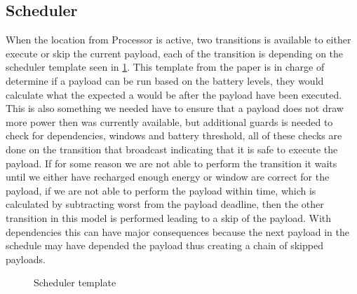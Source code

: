 \subsection*{Scheduler}
When the location  from Processor is active, two transitions is available to either execute or skip the current payload, each of the transition is depending on the scheduler template seen in \cref{fig:smc_S}. This template from the paper is in charge of determine if a payload can be run based on the battery levels, they would calculate what the expected a would be after the payload have been executed. This is also something we needed have to ensure that a payload does not draw more power then was currently available, but additional guards is needed to check for dependencies, windows and battery threshold, all of these checks are done on the transition that broadcast  indicating that it is safe to execute the payload. If for some reason we are not able to perform the transition it waits until we either have recharged enough energy or window are correct for the payload, if we are not able to perform the payload within time, which is calculated by subtracting worst from the payload deadline, then the other transition in this model is performed leading to a skip of the payload. With dependencies this can have major consequences because the next payload in the schedule may have depended the payload thus creating a chain of skipped payloads.

\begin{figure}[H]
	\centering
	\caption{Scheduler template}
	\label{fig:smc_S}
\end{figure}

